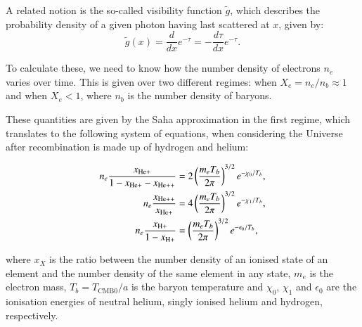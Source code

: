 \documentclass{aa}
\begin{document}
A related notion is the so-called visibility function $\tilde g$, which describes the probability density of a given photon having last scattered at $x$, given by:
\begin{equation}
\tilde{g}(x) = \frac{d}{dx}e^{-\tau} = -\frac{d\tau}{dx}e^{-\tau}.
\end{equation}

To calculate these, we need to know how the number density of electrons $n_e$ varies over time. This is given over two different regimes: when $X_e = n_e/n_b \approx 1$ and when $X_e < 1$, where $n_b$ is the number density of baryons.

These quantities are given by the Saha approximation in the first regime, which translates to the following system of equations, when considering the Universe after recombination is made up of hydrogen and helium:

\begin{align}
n_e\frac{x_{\rm He+}}{1-x_{\rm He+}-x_{\rm He++}} &= 2\left(\frac{m_eT_b}{2\pi}\right)^{3/2}e^{-\chi_0/T_b},\\
n_e\frac{x_{\rm He++}}{x_{\rm He+}} &= 4\left(\frac{m_eT_b}{2\pi}\right)^{3/2}e^{-\chi_1/T_b},\\
n_e\frac{x_{\rm H+}}{1-x_{\rm H+}} &= \left(\frac{m_eT_b}{2\pi}\right)^{3/2}e^{-\epsilon_0/T_b}, \label{eq:saha_h}
\end{align}

where $x_X$ is the ratio between the number density of an ionised state of an element and the number density of the same element in any state, $m_e$ is the electron mass, $T_b = T_\text{CMB0}/a$ is the baryon temperature and $\chi_0$, $\chi_1$ and $\epsilon_0$ are the ionisation energies of neutral helium, singly ionised helium and hydrogen, respectively.
\end{document}
